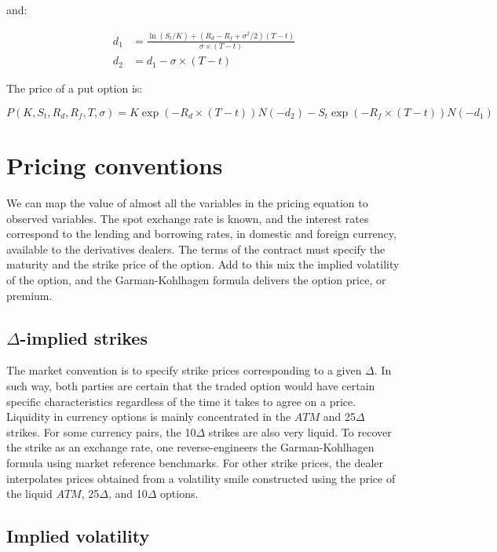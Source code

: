 \documentclass[]{book}
\theoremstyle{definition}
\theoremstyle{definition}
\theoremstyle{definition}
\theoremstyle{remark}
\begin{document}
and:

\[
\begin{aligned}
d_1 &= \frac{\ln(S_t/K)+(R_d-R_f+\sigma^2/2)(T-t)}{\sigma \times (T-t)}\\
d_2 &= d_1 - \sigma \times (T-t)
\end{aligned}
\]

The price of a put option is:

\[
P(K,S_t,R_d,R_f,T,\sigma) = K\exp(-R_d \times (T-t))N(-d_2) - S_t \exp(-R_f\times(T-t))N(-d_1) 
\]

\section{Pricing conventions}\label{pricing-conventions}

We can map the value of almost all the variables in the pricing equation
to observed variables. The spot exchange rate is known, and the interest
rates correspond to the lending and borrowing rates, in domestic and
foreign currency, available to the derivatives dealers. The terms of the
contract must specify the maturity and the strike price of the option.
Add to this mix the implied volatility of the option, and the
Garman-Kohlhagen formula delivers the option price, or premium.

\subsection{\texorpdfstring{\(\Delta\)-implied
strikes}{\textbackslash{}Delta-implied strikes}}\label{delta-implied-strikes}

The market convention is to specify strike prices corresponding to a
given \(\Delta\). In such way, both parties are certain that the traded
option would have certain specific characteristics regardless of the
time it takes to agree on a price. Liquidity in currency options is
mainly concentrated in the \(ATM\) and 25\(\Delta\) strikes. For some
currency pairs, the 10\(\Delta\) strikes are also very liquid. To
recover the strike as an exchange rate, one reverse-engineers the
Garman-Kohlhagen formula using market reference benchmarks. For other
strike prices, the dealer interpolates prices obtained from a volatility
smile constructed using the price of the liquid \(ATM\), 25\(\Delta\),
and 10\(\Delta\) options.

\subsection{Implied volatility}\label{implied-volatility}
\end{document}
